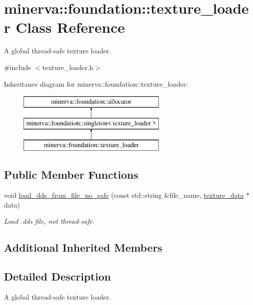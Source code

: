 \hypertarget{classminerva_1_1foundation_1_1texture__loader}{}\section{minerva\+:\+:foundation\+:\+:texture\+\_\+loader Class Reference}
\label{classminerva_1_1foundation_1_1texture__loader}


A global thread-\/safe texture loader.  




{\ttfamily \#include $<$texture\+\_\+loader.\+h$>$}

Inheritance diagram for minerva\+:\+:foundation\+:\+:texture\+\_\+loader\+:\begin{figure}[H]
\begin{center}
\leavevmode
\includegraphics[height=3.000000cm]{classminerva_1_1foundation_1_1texture__loader}
\end{center}
\end{figure}
\subsection*{Public Member Functions}
\begin{DoxyCompactItemize}
\item 
void \hyperlink{classminerva_1_1foundation_1_1texture__loader_a493b46fc8bb2d74195aa5a85db0a725f}{load\+\_\+dds\+\_\+from\+\_\+file\+\_\+no\+\_\+safe} (const std\+::string \&file\+\_\+name, \hyperlink{structminerva_1_1foundation_1_1texture__data}{texture\+\_\+data} $\ast$data)
\begin{DoxyCompactList}\small\item\em Load .dds file, not thread-\/safe. \end{DoxyCompactList}\end{DoxyCompactItemize}
\subsection*{Additional Inherited Members}


\subsection{Detailed Description}
A global thread-\/safe texture loader. 

